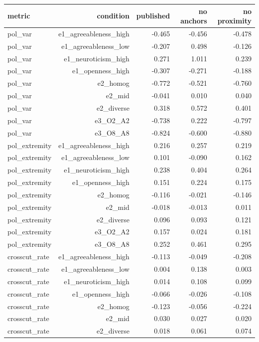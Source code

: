 \documentclass[11pt]{article}
\begin{document}
\begin{longtable}{@{}lrrrr@{}}
\toprule
metric & condition & published & no anchors & no proximity \\
\midrule
\endhead
pol\_var & e1\_agreeableness\_high & -0.465 & -0.456 & -0.478 \\
pol\_var & e1\_agreeableness\_low & -0.207 & 0.498 & -0.126 \\
pol\_var & e1\_neuroticism\_high & 0.271 & 1.011 & 0.239 \\
pol\_var & e1\_openness\_high & -0.307 & -0.271 & -0.188 \\
pol\_var & e2\_homog & -0.772 & -0.521 & -0.760 \\
pol\_var & e2\_mid & -0.041 & 0.010 & 0.040 \\
pol\_var & e2\_diverse & 0.318 & 0.572 & 0.401 \\
pol\_var & e3\_O2\_A2 & -0.738 & 0.222 & -0.797 \\
pol\_var & e3\_O8\_A8 & -0.824 & -0.600 & -0.880 \\
pol\_extremity & e1\_agreeableness\_high & 0.216 & 0.257 & 0.219 \\
pol\_extremity & e1\_agreeableness\_low & 0.101 & -0.090 & 0.162 \\
pol\_extremity & e1\_neuroticism\_high & 0.238 & 0.404 & 0.264 \\
pol\_extremity & e1\_openness\_high & 0.151 & 0.224 & 0.175 \\
pol\_extremity & e2\_homog & -0.116 & -0.021 & -0.146 \\
pol\_extremity & e2\_mid & -0.018 & -0.013 & 0.011 \\
pol\_extremity & e2\_diverse & 0.096 & 0.093 & 0.121 \\
pol\_extremity & e3\_O2\_A2 & 0.157 & 0.024 & 0.181 \\
pol\_extremity & e3\_O8\_A8 & 0.252 & 0.461 & 0.295 \\
crosscut\_rate & e1\_agreeableness\_high & -0.113 & -0.049 & -0.208 \\
crosscut\_rate & e1\_agreeableness\_low & 0.004 & 0.138 & 0.003 \\
crosscut\_rate & e1\_neuroticism\_high & 0.014 & 0.108 & 0.099 \\
crosscut\_rate & e1\_openness\_high & -0.066 & -0.026 & -0.108 \\
crosscut\_rate & e2\_homog & -0.123 & -0.056 & -0.224 \\
crosscut\_rate & e2\_mid & 0.030 & 0.027 & 0.020 \\
crosscut\_rate & e2\_diverse & 0.018 & 0.061 & 0.074 \\

\end{longtable}
\end{document}
